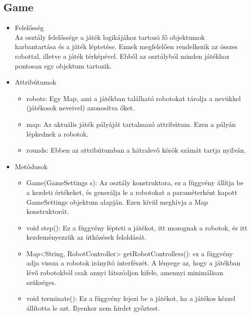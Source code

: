 \subsection{Game}
\begin{itemize}
	\item Felelősség\\
	Az osztály felelőssége a játék logikájához tartozó fő objektumok karbantartása és a játék léptetése. Ennek megfelelően rendelkezik az összes robottal, illetve a játék térképével. Ebből az osztályból minden játékhoz pontosan egy objektum tartozik.
	\item Attribútumok
	\begin{itemize}
		\item robots: Egy Map, ami a játékban található robotokat tárolja a nevükkel (játékosok neveivel) azonosítva őket.
		\item map: Az aktuális játék pályáját tartalmazó attribútum. Ezen a pályán lépkednek a robotok.
		\item rounds: Ebben az attribútumban a hátralevő körök számát tartja nyilván.
	\end{itemize}
	\item Metódusok
	\begin{itemize}
		\item Game(GameSettings s): Az osztály konstruktora, ez a függvény állítja be a kezdeti értékeket, és generálja le a robotokat a paraméterként kapott GameSettings objektum alapján. Ezen kívül meghívja a Map konstruktorát.
		\item void step(): Ez a függvény lépteti a játékot, itt mozognak a robotok, és itt kezdeményezzük az ütközések feloldását.
		\item Map<String, RobotController> getRobotControllers(): ez a függvény adja vissza a robotok irányító interfészét. A lényege az, hogy a játékban lévő robotokból csak annyi látszódjon kifele, amennyi minimálisan szükséges.
		\item void terminate(): Ez a függvény fejezi be a játékot, ha a játékos kézzel állította le azt. Ilyenkor nem hirdet győztest.
	\end{itemize}
\end{itemize}

